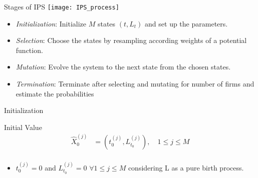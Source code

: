\begin{frame}{Stages of IPS}
\texttt{[image: IPS\_process]}
\begin{itemize}
\item \textit{Initialization}: Initialize $M$ states $\left(t,L_{t}\right)$ and set up the parameters.
\item \textit{Selection}: Choose the states by resampling according weights of a potential function.
\item \textit{Mutation}: Evolve the system to the next state from the chosen states.
\item \textit{Termination}: Terminate after selecting and mutating for number of firms and estimate the probabilities
\end{itemize}
\end{frame}

\begin{frame}{Initialization}
	\begin{block}{Initial Value}
		\begin{equation*}
			\begin{split}
				\hat{X}_0^{(j)} &= \left( t_{0}^{(j)},L_{t_0}^{(j)} \right),  \quad 
				 1 \leq j\leq M                                                                    \\
			\end{split}
		\end{equation*}
	\end{block}
	\begin{itemize}
		\item  $ t_{0}^{(j)} = 0$ and $ L_{t_{0}}^{(j)} = 0$ $\forall 1 \leq j\leq M $ considering L as a pure birth process.
	\end{itemize}
\end{frame}

